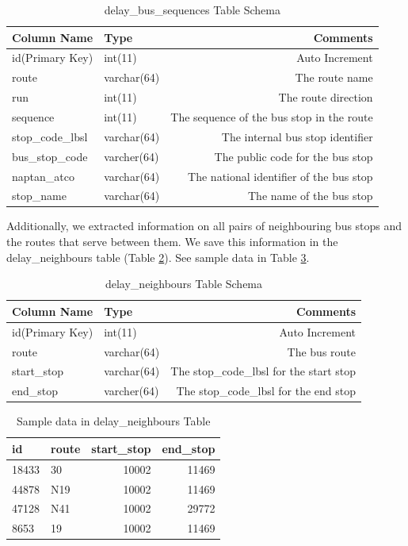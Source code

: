 \begin{table}
\centering
\begin{tabular}{@{}llr@{}} \toprule
Column Name & Type & Comments\\ \midrule
id(Primary Key) & int(11)  & Auto Increment\\
route & varchar(64) &  The route name\\
run & int(11) & The route direction\\
sequence & int(11) & The sequence of the bus stop in the route\\
stop\_code\_lbsl & varchar(64) & The internal bus stop identifier\\
bus\_stop\_code & varcher(64) & The public code for the bus stop\\
naptan\_atco & varchar(64) & The national identifier of the bus stop\\
stop\_name & varchar(64) & The name of the bus stop\\ \bottomrule
\end{tabular}
\caption{delay\_bus\_sequences Table Schema}
\label{table:delay_bus_sequences}
\end{table}
\par Additionally, we extracted information on all pairs of neighbouring bus stops and the routes that serve between them. We save this information in the delay\_neighbours table (Table \ref{table:delay_neighbours}). See sample data in Table \ref{table:sample_neighbours_view}.

\begin{table}
\centering
\begin{tabular}{@{}llr@{}} \toprule
Column Name & Type & Comments\\ \midrule
id(Primary Key) & int(11)  & Auto Increment\\
route & varchar(64) & The bus route \\
start\_stop & varchar(64) & The stop\_code\_lbsl for the start stop\\
end\_stop & varcher(64) & The stop\_code\_lbsl for the end stop\\ \bottomrule
\end{tabular}
\caption{delay\_neighbours Table Schema}
\label{table:delay_neighbours}
\end{table}

\begin{table}
\centering
\begin{tabular}{@{}llrr@{}} \toprule
id & route & start\_stop & end\_stop \\ \midrule
18433 & 30 & 10002 & 11469 \\
44878 & N19 & 10002 & 11469 \\
47128 & N41 & 10002 & 29772 \\
8653 & 19 & 10002 & 11469 \\ \bottomrule
\end{tabular}
\caption{Sample data in delay\_neighbours Table}
\label{table:sample_neighbours_view}
\end{table}

